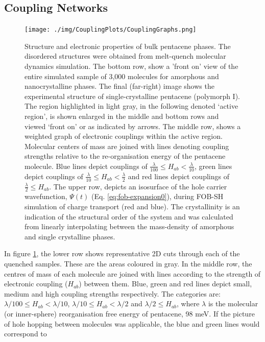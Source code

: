 \subsection{Coupling Networks}
\label{sect:couplGraphs}
\begin{figure}[ht]
	\texttt{[image: ./img/CouplingPlots/CouplingGraphs.png]}
	\caption{\label{fig:crystalCouplingGraph}Structure and electronic properties of bulk pentacene phases.  The disordered structures were obtained from melt-quench molecular dynamics simulation.   
	The bottom row, show a 'front on' view of the entire simulated sample of 3,000 molecules for amorphous and nanocrystalline phases.  The final (far-right) image shows the experimental structure of single-crystalline pentacene (polymorph I)\cite{Campbell1961}.  
    The region highlighted in light gray, in the following denoted `active region', is shown enlarged in the middle and bottom rows and viewed `front on' or as indicated by arrows. 
     The middle row, shows a weighted graph of electronic couplings within the active region. Molecular centers of mass are joined with lines denoting coupling 
    strengths relative to the re-organisation energy of the pentacene molecule. Blue lines depict couplings of $\frac{\lambda}{100} \le H_{ab} < \frac{\lambda}{10}$, 
    green lines depict couplings of $\frac{\lambda}{10} \le H_{ab} < \frac{\lambda}{2}$ and red lines depict couplings of $\frac{\lambda}{2} \le H_{ab}$.
     The upper row, depicts an isosurface of the hole carrier wavefunction, $\Psi(t)$ (Eq. \eqref{eq:fob-expansion0}), during 
     FOB-SH simulation of charge transport (red and blue).
     The crystallinity is an indication of the structural order of the system and was calculated from linearly interpolating between the mass-density of amorphous and single crystalline 
	 phases.}
\end{figure}
\noindent In figure \ref{fig:crystalCouplingGraph}, the lower row shows representative 2D cuts through each of the quenched samples. These are the areas coloured in gray. In the middle row, the centres of mass of each molecule are joined with lines according to 
the strength of electronic coupling ($H_{ab}$) between them. Blue, green and red lines depict small, medium and high coupling strengths respectively. The categories are: 
$\lambda/100 \le H_{ab} < \lambda/10$,  $\lambda/10 \le H_{ab} < \lambda/2$ and $\lambda/2 \le H_{ab}$, where $\lambda$ is the molecular (or inner-sphere) 
reorganisation free energy of pentacene, 98 meV.  If the picture of hole hopping between molecules was applicable, the blue and green lines would correspond to 
